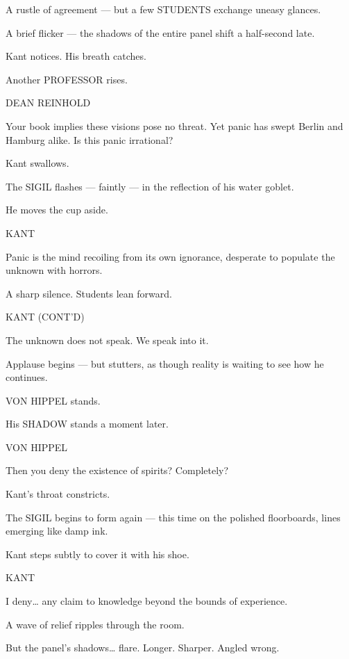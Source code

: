 \documentclass[12pt]{article}
\newenvironment{dialogue}[1]{%
  \vspace{0.8\baselineskip}%
  \noindent\hspace*{2.3in}\textsc{#1}\par%
  \noindent\hspace*{1.5in}\begin{minipage}[t]{4.5in}%
}{%
  \end{minipage}\par%
}
\begin{document}
A rustle of agreement — but a few STUDENTS exchange uneasy glances.

A brief flicker — the shadows of the entire panel shift a half-second late.

Kant notices. His breath catches.

Another PROFESSOR rises.

\begin{dialogue}{DEAN REINHOLD}
Your book implies these visions pose no threat.  
Yet panic has swept Berlin and Hamburg alike.
Is this panic irrational?
\end{dialogue}

Kant swallows.

The SIGIL flashes — faintly — in the reflection of his water goblet.

He moves the cup aside.

\begin{dialogue}{KANT}
Panic is the mind recoiling from its own ignorance,  
desperate to populate the unknown with horrors.
\end{dialogue}

A sharp silence. Students lean forward.

\begin{dialogue}{KANT (CONT'D)}
The unknown does not speak.  
We speak into it.
\end{dialogue}

Applause begins — but stutters, as though reality is waiting to see how he continues.

VON HIPPEL stands.

His SHADOW stands a moment later.

\begin{dialogue}{VON HIPPEL}
Then you deny the existence of spirits?  
Completely?
\end{dialogue}

Kant’s throat constricts.

The SIGIL begins to form again — this time on the polished floorboards,
lines emerging like damp ink.

Kant steps subtly to cover it with his shoe.

\begin{dialogue}{KANT}
I deny…  
any claim to knowledge beyond the bounds of experience.
\end{dialogue}

A wave of relief ripples through the room.

But the panel’s shadows… flare. 
Longer. Sharper. Angled wrong.
\end{document}
